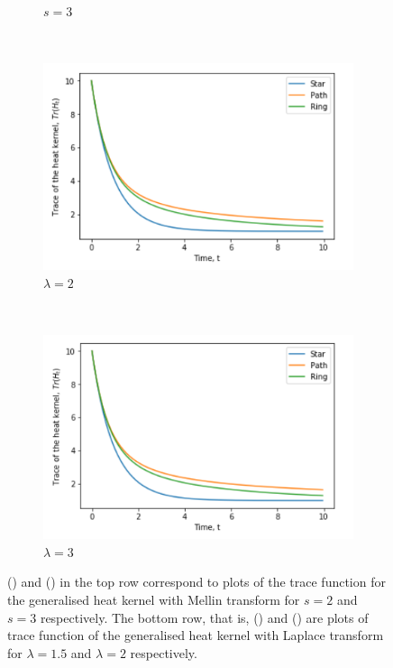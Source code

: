 \documentclass[10pt,a4paper]{article}
\begin{document}
\begin{figure}[H]
\begin{subfigure}[b]{0.35\textwidth}
        		\caption{$s=3$}
        		\label{threegraphMellin3}
        	\end{subfigure} \\
        	\begin{subfigure}[b]{0.35\textwidth}
        		\includegraphics[width= \textwidth]{images/graphskernellaplace2.png}
        		\caption{$\lambda=2$}
        		\label{threegraphLaplace2}
        	\end{subfigure}~
	        \begin{subfigure}[b]{0.35\textwidth}
	        	\includegraphics[width= \textwidth]{images/graphskernellaplace3.png}
	        	\caption{$\lambda=3$}
	        	\label{threegraphLaplace3}
	        \end{subfigure}
        	\caption{() and () in the top row correspond to plots of the trace function for the generalised heat kernel with Mellin transform for $s=2$ and $s=3$ respectively. The bottom row, that is, () and () are plots of trace function of the generalised heat kernel with Laplace transform for $\lambda=1.5$ and $\lambda=2$ respectively.}
        	\label{genthreegraphsTraceplots}
        \end{figure}
\end{document}
